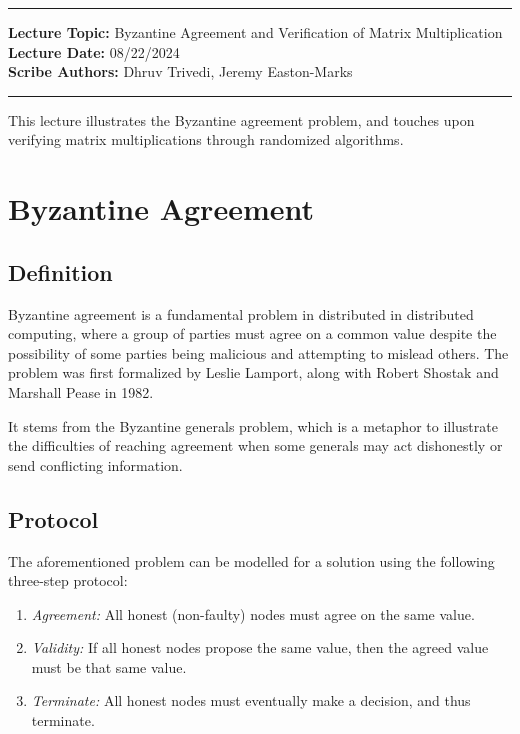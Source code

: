 \hrule
\vspace{0.1in}
\noindent
\textbf{Lecture Topic: }Byzantine Agreement and Verification of Matrix Multiplication \\
\textbf{Lecture Date: }08/22/2024 \\
\textbf{Scribe Authors: }Dhruv Trivedi, Jeremy Easton-Marks
\vspace{0.1in}
\hrule
\vspace{0.1in}

This lecture illustrates the Byzantine agreement problem, and touches upon verifying matrix multiplications through randomized algorithms.

\section*{Byzantine Agreement}
    \subsection*{Definition}
        Byzantine agreement is a fundamental problem in distributed in distributed computing, where a group of parties must agree on a common value despite the possibility of some parties being malicious and attempting to mislead others. The problem was first formalized by Leslie Lamport, along with Robert Shostak and Marshall Pease in 1982.

        It stems from the Byzantine generals problem, which is a metaphor to illustrate the difficulties of reaching agreement when some generals may act dishonestly or send conflicting information.

    \subsection*{Protocol}
        The aforementioned problem can be modelled for a solution using the following three-step protocol:

        \begin{enumerate}
            \item \emph{Agreement:} All honest (non-faulty) nodes must agree on the same value.

            \item \emph{Validity:} If all honest nodes propose the same value, then the agreed value must be that same value.

            \item \emph{Terminate:} All honest nodes must eventually make a decision, and thus terminate.
        \end{enumerate}

